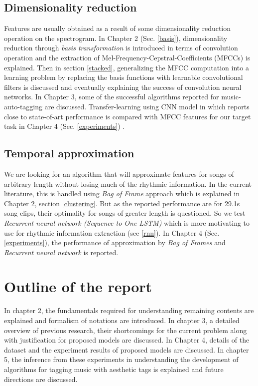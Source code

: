 \subsection{Dimensionality reduction}
Features are usually obtained as a result of some dimensionality reduction operation on the spectrogram. In Chapter 2 (Sec. \ref{basis}), dimensionality reduction through \textit{basis transformation} is introduced in terms of convolution operation and the extraction of Mel-Frequency-Cepstral-Coefficients (MFCCs) is explained. Then in section \ref{stacked}, generalizing the MFCC computation into a learning problem by replacing the basis functions with learnable convolutional filters is discussed and eventually explaining the success of convolution neural networks. In Chapter 3, some of the successful algorithms reported for music-auto-tagging are discussed. Transfer-learning using CNN model in \cite{choi_cnn} which reports close to state-of-art performance is compared with MFCC features for our target task in Chapter 4 (Sec. \ref{experiments}) .
    
\subsection{Temporal approximation}
We are looking for an algorithm that will approximate features for songs of arbitrary length without losing much of the rhythmic information. In the current literature, this is handled using \textit{Bag of Frame} approach which is explained in Chapter 2, section \ref{clustering}. But as the reported performance are for 29.1s song clips, their optimality for songs of greater length is questioned. So we test \textit{Recurrent neural network (Sequence to One LSTM)} which is more motivating to use for rhythmic information extraction (see \ref{rnn}). In Chapter 4 (Sec. \ref{experiments}), the performance of approximation by \textit{Bag of Frames} and \textit{Recurrent neural network} is reported.



\section{Outline of the report}
In chapter 2, the fundamentals required for understanding remaining contents are explained  and formalism of notations are introduced. In chapter 3, a detailed overview of previous research, their shortcomings for the current problem along with justification for proposed models are discussed. In Chapter 4, details of the dataset and the experiment results of proposed models are discussed. In chapter 5, the inference from these experiments in understanding the development of algorithms for tagging music with aesthetic tags is explained and future directions are discussed. 







